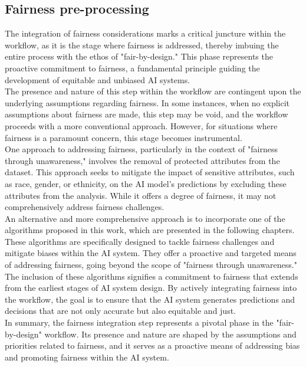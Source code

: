 \documentclass[12pt,a4paper,openright,twoside]{book}
\begin{document}
\subsection{Fairness pre-processing}
The integration of fairness considerations marks a critical juncture within the workflow, as it is the stage where fairness is addressed, thereby imbuing the entire process with the ethos of "fair-by-design." This phase represents the proactive commitment to fairness, a fundamental principle guiding the development of equitable and unbiased AI systems. \\
The presence and nature of this step within the workflow are contingent upon the underlying assumptions regarding fairness. In some instances, when no explicit assumptions about fairness are made, this step may be void, and the workflow proceeds with a more conventional approach. However, for situations where fairness is a paramount concern, this stage becomes instrumental. \\
One approach to addressing fairness, particularly in the context of "fairness through unawareness," involves the removal of protected attributes from the dataset. This approach seeks to mitigate the impact of sensitive attributes, such as race, gender, or ethnicity, on the AI model's predictions by excluding these attributes from the analysis. While it offers a degree of fairness, it may not comprehensively address fairness challenges. \\
An alternative and more comprehensive approach is to incorporate one of the algorithms proposed in this work, which are presented in the following chapters. These algorithms are specifically designed to tackle fairness challenges and mitigate biases within the AI system. They offer a proactive and targeted means of addressing fairness, going beyond the scope of "fairness through unawareness." \\
The inclusion of these algorithms signifies a commitment to fairness that extends from the earliest stages of AI system design. By actively integrating fairness into the workflow, the goal is to ensure that the AI system generates predictions and decisions that are not only accurate but also equitable and just. \\
In summary, the fairness integration step represents a pivotal phase in the "fair-by-design" workflow. Its presence and nature are shaped by the assumptions and priorities related to fairness, and it serves as a proactive means of addressing bias and promoting fairness within the AI system.
\end{document}
